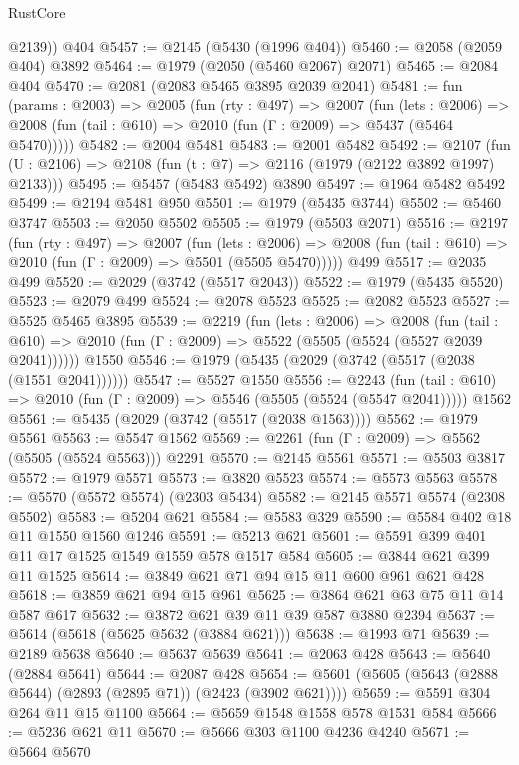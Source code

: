 \begin{lexlean}{RustCore}
\begin{coremodule}
        @2139))
    @404
@5457 := @2145 (@5430 (@1996 @404))
@5460 := @2058 (@2059 @404) @3892
@5464 := @1979 (@2050 (@5460 @2067) @2071)
@5465 := @2084 @404
@5470 := @2081 (@2083 @5465 @3895 @2039 @2041)
@5481 := fun (params : @2003) =>
  @2005
    (fun (rty : @497) =>
    @2007
      (fun (lets : @2006) =>
      @2008 (fun (tail : @610) => @2010 (fun (Γ : @2009) => @5437 (@5464 @5470)))))
@5482 := @2004 @5481
@5483 := @2001 @5482
@5492 := @2107 (fun (U : @2106) => @2108 (fun (t : @7) => @2116 (@1979 (@2122 @3892 @1997) @2133)))
@5495 := @5457 (@5483 @5492) @3890
@5497 := @1964 @5482 @5492
@5499 := @2194 @5481 @950
@5501 := @1979 (@5435 @3744)
@5502 := @5460 @3747
@5503 := @2050 @5502
@5505 := @1979 (@5503 @2071)
@5516 := @2197
    (fun (rty : @497) =>
    @2007
      (fun (lets : @2006) =>
      @2008 (fun (tail : @610) => @2010 (fun (Γ : @2009) => @5501 (@5505 @5470)))))
    @499
@5517 := @2035 @499
@5520 := @2029 (@3742 (@5517 @2043))
@5522 := @1979 (@5435 @5520)
@5523 := @2079 @499
@5524 := @2078 @5523
@5525 := @2082 @5523
@5527 := @5525 @5465 @3895
@5539 := @2219
    (fun (lets : @2006) =>
    @2008
      (fun (tail : @610) => @2010 (fun (Γ : @2009) => @5522 (@5505 (@5524 (@5527 @2039 @2041))))))
    @1550
@5546 := @1979 (@5435 (@2029 (@3742 (@5517 (@2038 (@1551 @2041))))))
@5547 := @5527 @1550
@5556 := @2243
    (fun (tail : @610) => @2010 (fun (Γ : @2009) => @5546 (@5505 (@5524 (@5547 @2041)))))
    @1562
@5561 := @5435 (@2029 (@3742 (@5517 (@2038 @1563))))
@5562 := @1979 @5561
@5563 := @5547 @1562
@5569 := @2261 (fun (Γ : @2009) => @5562 (@5505 (@5524 @5563))) @2291
@5570 := @2145 @5561
@5571 := @5503 @3817
@5572 := @1979 @5571
@5573 := @3820 @5523
@5574 := @5573 @5563
@5578 := @5570 (@5572 @5574) (@2303 @5434)
@5582 := @2145 @5571 @5574 (@2308 @5502)
@5583 := @5204 @621
@5584 := @5583 @329
@5590 := @5584 @402 @18 @11 @1550 @1560 @1246
@5591 := @5213 @621
@5601 := @5591 @399 @401 @11 @17 @1525 @1549 @1559 @578 @1517 @584
@5605 := @3844 @621 @399 @11 @1525
@5614 := @3849 @621 @71 @94 @15 @11 @600 @961 @621 @428
@5618 := @3859 @621 @94 @15 @961
@5625 := @3864 @621 @63 @75 @11 @14 @587 @617
@5632 := @3872 @621 @39 @11 @39 @587 @3880 @2394
@5637 := @5614 (@5618 (@5625 @5632 (@3884 @621)))
@5638 := @1993 @71
@5639 := @2189 @5638
@5640 := @5637 @5639
@5641 := @2063 @428
@5643 := @5640 (@2884 @5641)
@5644 := @2087 @428
@5654 := @5601 (@5605 (@5643 (@2888 @5644) (@2893 (@2895 @71)) (@2423 (@3902 @621))))
@5659 := @5591 @304 @264 @11 @15 @1100
@5664 := @5659 @1548 @1558 @578 @1531 @584
@5666 := @5236 @621 @11
@5670 := @5666 @303 @1100 @4236 @4240
@5671 := @5664 @5670

\end{coremodule}
\end{lexlean}
